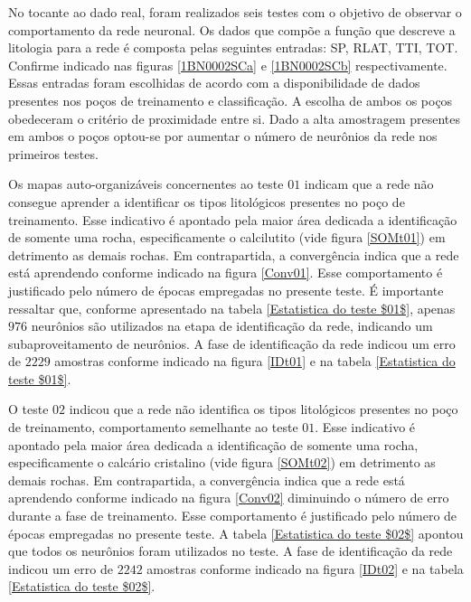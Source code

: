 No tocante ao dado real, foram realizados seis testes com o objetivo de observar o comportamento da rede neuronal. Os dados que compõe a função que descreve a litologia para a rede é composta pelas seguintes entradas: SP, RLAT, TTI, TOT. Confirme indicado nas figuras \ref{1BN0002SCa} e \ref{1BN0002SCb} respectivamente. Essas entradas foram escolhidas de acordo com a disponibilidade de dados presentes nos poços de treinamento e classificação. A escolha de ambos os poços obedeceram o critério de proximidade entre si. Dado a alta amostragem presentes em ambos o poços optou-se por aumentar o número de neurônios da rede nos primeiros testes.

Os mapas auto-organizáveis concernentes ao teste $01$ indicam que a rede não consegue aprender a identificar os tipos litológicos presentes no poço de treinamento. Esse indicativo é apontado pela maior área dedicada a identificação de somente uma rocha, especificamente o calcilutito (vide figura \ref{SOMt01}) em detrimento as demais rochas. Em contrapartida, a convergência indica que a rede está aprendendo conforme indicado na figura \ref{Conv01}. Esse comportamento é justificado pelo número de épocas empregadas no presente teste. É importante ressaltar que, conforme apresentado na tabela \ref{Estatistica do teste $01$}, apenas $976$ neurônios são utilizados na etapa de identificação da rede, indicando um subaproveitamento de neurônios. A fase de identificação da rede indicou um erro de $2229$ amostras conforme indicado na figura \ref{IDt01} e na tabela \ref{Estatistica do teste $01$}.

O teste $02$ indicou que a rede não identifica os tipos litológicos presentes no poço de treinamento, comportamento semelhante ao teste $01$. Esse indicativo é apontado pela maior área dedicada a identificação de somente uma rocha, especificamente o calcário cristalino (vide figura \ref{SOMt02}) em detrimento as demais rochas. Em contrapartida, a convergência indica que a rede está aprendendo conforme indicado na figura \ref{Conv02} diminuindo o número de erro durante a fase de treinamento. Esse comportamento é justificado pelo número de épocas empregadas no presente teste. A tabela \ref{Estatistica do teste $02$} apontou que todos os neurônios foram utilizados no teste. A fase de identificação da rede indicou um erro de $2242$ amostras conforme indicado na figura \ref{IDt02} e na tabela \ref{Estatistica do teste $02$}.

